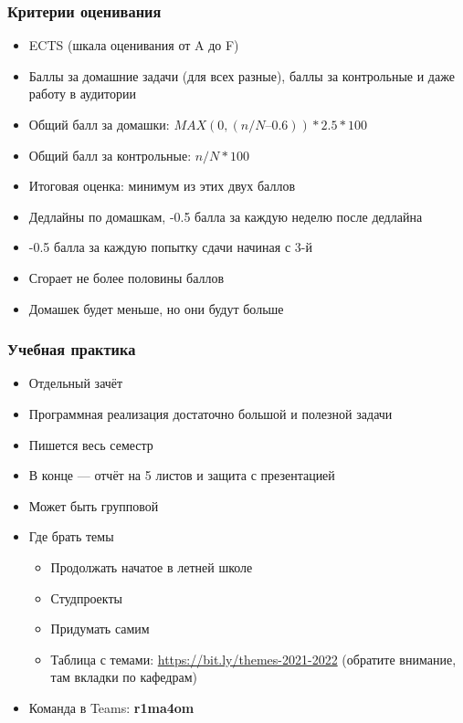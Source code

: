 \documentclass[xetex,mathserif,serif]{beamer}
\begin{document}
    \begin{frame}
        \frametitle{Критерии оценивания}
        \begin{itemize}
            \item ECTS (шкала оценивания от A до F)
            \item Баллы за домашние задачи (для всех разные), баллы за контрольные и даже работу в аудитории
            \item Общий балл за домашки: $MAX(0, (n/N – 0.6)) * 2.5 * 100$
            \item Общий балл за контрольные: $n/N * 100$
            \item Итоговая оценка: минимум из этих двух баллов
            \item Дедлайны по домашкам, -0.5 балла за каждую неделю после дедлайна
            \item -0.5 балла за каждую попытку сдачи начиная с 3-й
            \item Сгорает не более половины баллов
            \item Домашек будет меньше, но они будут больше
        \end{itemize}
    \end{frame}

    \begin{frame}
        \frametitle{Учебная практика}
        \begin{itemize}
            \item Отдельный зачёт
            \item Программная реализация достаточно большой и полезной задачи
            \item Пишется весь семестр
            \item В конце --- отчёт на 5 листов и защита с презентацией
            \item Может быть групповой
            \item Где брать темы
            \begin{itemize}
                \item Продолжать начатое в летней школе
                \item Студпроекты
                \item Придумать самим
                \item Таблица с темами: \url{https://bit.ly/themes-2021-2022} (обратите внимание, там вкладки по кафедрам)
            \end{itemize}
            \item Команда в Teams: \textbf{r1ma4om}
        \end{itemize}
    \end{frame}
\end{document}
